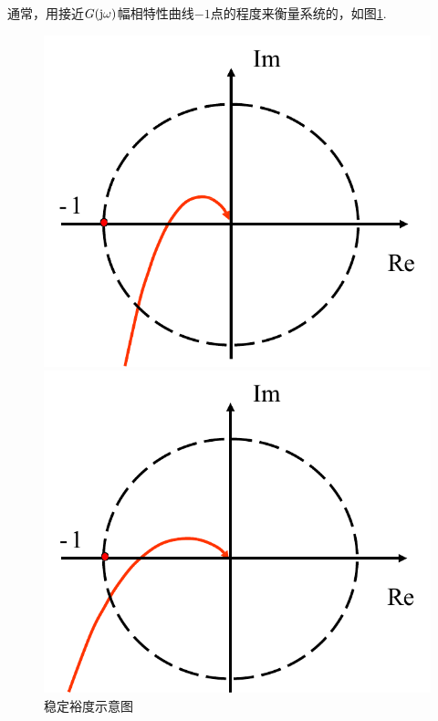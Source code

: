 通常，用接近$G(\text{j} \omega)$幅相特性曲线$-1$点的程度来衡量系统的，如图\ref{稳定裕度1}.
\begin{figure}[!htb]
	\centering
	\begin{minipage}{0.4\linewidth}
		\centering
		\includegraphics[width=0.9\linewidth]{pic/稳定裕度1.pdf}
	\end{minipage}
	\begin{minipage}{0.4\linewidth}
		\centering
		\includegraphics[width=0.9\linewidth]{pic/稳定裕度2.pdf}
	\end{minipage}
	\caption{稳定裕度示意图}
	\label{稳定裕度1}
\end{figure}

